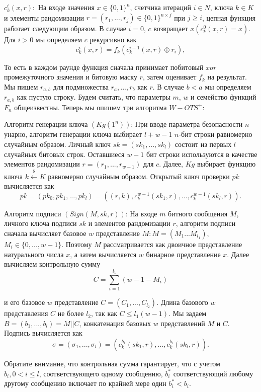 \documentclass[a4paper, 14pt]{extarticle}
\begin{document}
$c^{i}_{k}(x, r):$ На входе значения $x \in \{0, 1\}^{n}$, счетчика итераций $i \in N$, ключа $k \in K$ и элементы рандомизации $r = (r_{1}, ..., r_{j}) \in \{0, 1\}^{n \times j}$ при $j \geq i$, цепная функция работает следующим образом. В случае $i = 0$, $c$ возвращает $x(c^{0}_{k}(x, r) = x)$. Для $i > 0$ мы определяем $c$ рекурсивно как
\[ c^{i}_{k}(x, r) = f_{k}(c^{i - 1}_{k}(x, r) \oplus r_{i}) ,\]

То есть в каждом раунде функция сначала принимает побитовый $xor$ промежуточного значения и битовую маску $r$, затем оценивает $f_{k}$ на результат. Мы пишем $r_{a,b}$ для подмножества $r_{a}, ..., r_{b}$ как $r$. В случае $b < a$ мы определяем $r_{a,b}$ как пустую строку. Будем считать, что параметры $m$, $w$ и семейство функций $F_{n}$ общеизвестны. Теперь мы опишем три алгоритма $W-OTS^{+}$:

Алгоритм генерации ключа $(Kg(1^n))$: При вводе параметра безопасности $n$ унарно, алгоритм генерации ключа выбирает $l + w - 1$ $n$-бит строки равномерно случайным образом. Личный ключ $sk = (sk_{1}, ..., sk_{l})$ состоит из первых $l$ случайных битовых строк. Оставшиеся $w - 1$ бит строки используются в качестве элементов рандомизации $r = (r_{1}, ..., r_{w - 1})$ для $c$. Далее, $Kg$ выбирает функцию ключа $k \stackrel{\$}\leftarrow K$ равномерно случайным образом. Открытый ключ проверки $pk$ вычисляется как
\[ pk = (pk_{0}, pk_{1}, ..., pk_{l}) = ((r, k),c^{w - 1}_{k}(sk_{1},r), ..., c^{w - 1}_{k}(sk_{l}, r)). \]

Алгоритм подписи $(Sign(M, sk, r))$: На входе $m$ битного сообщения $M$, личного ключа подписи $sk$ и элементов рандомизации $r$, алгоритм подписи сначала вычисляет базовое $w$ представление $M: M = (M_{1} . . . M_{l_{1}} )$, $M_{i} \in \{0, ..., w - 1\}$. Поэтому $M$ рассматривается как двоичное представление натурального числа $x$, а затем вычисляется $w$ бинарное представление $x$. Далее вычисляем контрольную сумму
\[ C = \sum^{l_{1}}_{i = 1}(w - 1 - M_{i}) \]

и его базовое $w$ представление $C = (C_{1}, ..., C_{l_{2}})$. Длина базового $w$ представления $C$ не более $l_{2}$, так как $C \leq l_{1}(w - 1)$. Мы задаем $B = (b_{1}, ..., b_{l}) = M || C$, конкатенация базовых $w$ представлений $M$ и $C$. Подпись вычисляется как
\[ \sigma = (\sigma_{1}, ..., \sigma_{l}) = (c^{b_{1}}_{k}(sk_{1},r), ..., c^{b_{l}}_{k}(sk_{l},r)). \]

Обратите внимание, что контрольная сумма гарантирует, что с учетом \newline
$b_{i}, 0 < i \leq l$, соответствующего одному сообщению, $b^{*}_{i}$ соответствующий любому другому сообщению включает по крайней мере один $b^{*}_{i} < b_{i}$.
\end{document}
